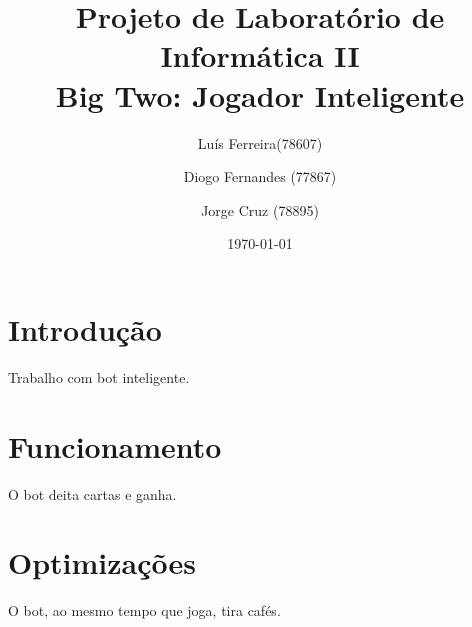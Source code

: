 \documentclass[a4paper]{article}
\title{Projeto de Laboratório de Informática II \\Big Two: Jogador Inteligente}
\author{Luís Ferreira(78607) \and Diogo Fernandes (77867) \and Jorge Cruz (78895)}
\date{\today}
\begin{document}
\maketitle


\begin{abstract}
\end{abstract}

\tableofcontents

\section{Introdução}
	Trabalho com bot inteligente.

\section{Funcionamento}
	O bot deita cartas e ganha.

\section{Optimizações}
	O bot, ao mesmo tempo que joga, tira cafés.
\end{document}
